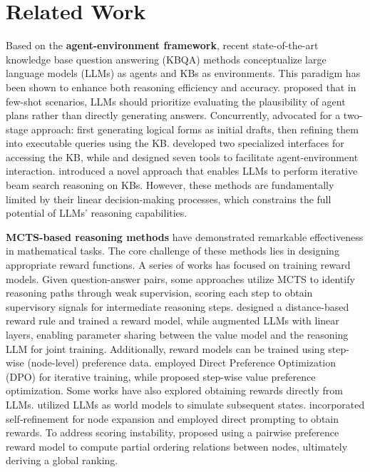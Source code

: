 \section{Related Work}

Based on the \textbf{agent-environment framework}, recent state-of-the-art knowledge base question answering (KBQA) methods conceptualize large language models (LLMs) as agents and KBs as environments. This paradigm has been shown to enhance both reasoning efficiency and accuracy.
\citet{Gu-Yu-ACL-2023-Pangu} proposed that in few-shot scenarios, LLMs should prioritize evaluating the plausibility of agent plans rather than directly generating answers. 
Concurrently, \citet{Li-Tianle-ACL-2023-KB-BINDER} advocated for a two-stage approach: first generating logical forms as initial drafts, then refining them into executable queries using the KB.
\citet{Jiang-EMNLP-2023-StructGPT} developed two specialized interfaces for accessing the KB, while \citet{Gu-Yu-arXiv-2024-Middleware} and \citet{Liu-Xiao-ICLR-2023-AgentBench} designed seven tools to facilitate agent-environment interaction. \citet{Jiashuo-Sun-ICLR-2024-Think-on-Graph} introduced a novel approach that enables LLMs to perform iterative beam search reasoning on KBs.
However, these methods are fundamentally limited by their linear decision-making processes, which constrains the full potential of LLMs' reasoning capabilities.

\textbf{MCTS-based reasoning methods} have demonstrated remarkable effectiveness in mathematical tasks. The core challenge of these methods lies in designing appropriate reward functions.
A series of works has focused on training reward models. Given question-answer pairs, some approaches utilize MCTS to identify reasoning paths through weak supervision, scoring each step to obtain supervisory signals for intermediate reasoning steps. \citet{Zhang-Dan-NIPS-2024-ReST-MCTS} designed a distance-based reward rule and trained a reward model, while \citet{Chen-Guoxin-NIPS-2024-AlphaMath} augmented LLMs with linear layers, enabling parameter sharing between the value model and the reasoning LLM for joint training.
Additionally, reward models can be trained using step-wise (node-level) preference data. \citet{Xie-Yuxi-arXiv-2024-MCTS-Preference-Learning} employed Direct Preference Optimization (DPO) for iterative training, while \citet{Wang-Chaojie-arXiv-2024-Q-star} proposed step-wise value preference optimization.
Some works have also explored obtaining rewards directly from LLMs. \citet{Hao-Shibo-EMNLP-2023-Reasoning-via-Planning-RAP} utilized LLMs as world models to simulate subsequent states. \citet{Zhang-Di-arXiv-2024-Accessing-GPT-4-level-Mathematical} incorporated self-refinement for node expansion and employed direct prompting to obtain rewards. To address scoring instability, \citet{Zhang-Di-arXiv-2024-LLaMA-Berry} proposed using a pairwise preference reward model to compute partial ordering relations between nodes, ultimately deriving a global ranking.

